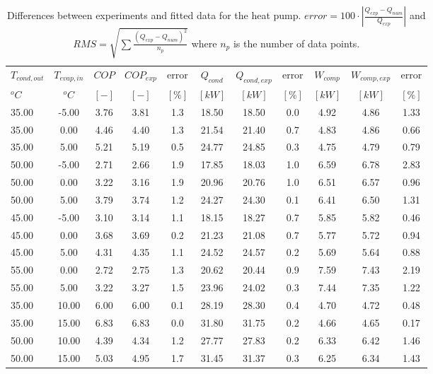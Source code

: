 \documentclass[english]{SPFShortReport}
\begin{document}
\begin{table}[!ht]
\begin{small}
\caption{Differences between experiments and fitted data for the heat pump.          $error=100 \cdot |\frac{Q_{exp}-Q_{num}}{Q_{exp}}|$ and $RMS = \sqrt { \sum{\frac{(Q_{exp}-Q_{num})^2}{n_p}} }$ where $n_p$ is the number of data points.}
\begin{center}
\resizebox{12cm}{!} 
{
\begin{tabular}{l | c c c c c c c c c c } 
\hline
\hline
$T_{cond,out}$ &$T_{evap,in}$ &$COP$ &$COP_{exp}$ &error &$Q_{cond}$ &$Q_{cond,exp}$ &error &$W_{comp}$ &$W_{comp,exp}$ &error \\ 
$^oC$ &$^oC$ &$[-]$ &$[-]$ &$[\%]$ &$[kW]$ &$[kW]$ &$[\%]$ &$[kW]$ &$[kW]$ &$[\%]$\\ 
\hline
35.00  & -5.00 & 3.76 & 3.81 & 1.3 & 18.50 & 18.50 & 0.0 & 4.92 & 4.86 & 1.33\\ 
35.00  & 0.00 & 4.46 & 4.40 & 1.3 & 21.54 & 21.40 & 0.7 & 4.83 & 4.86 & 0.66\\ 
35.00  & 5.00 & 5.21 & 5.19 & 0.5 & 24.77 & 24.85 & 0.3 & 4.75 & 4.79 & 0.79\\ 
50.00  & -5.00 & 2.71 & 2.66 & 1.9 & 17.85 & 18.03 & 1.0 & 6.59 & 6.78 & 2.83\\ 
50.00  & 0.00 & 3.22 & 3.16 & 1.9 & 20.96 & 20.76 & 1.0 & 6.51 & 6.57 & 0.96\\ 
50.00  & 5.00 & 3.79 & 3.74 & 1.2 & 24.27 & 24.30 & 0.1 & 6.41 & 6.50 & 1.31\\ 
45.00  & -5.00 & 3.10 & 3.14 & 1.1 & 18.15 & 18.27 & 0.7 & 5.85 & 5.82 & 0.46\\ 
45.00  & 0.00 & 3.68 & 3.69 & 0.2 & 21.23 & 21.08 & 0.7 & 5.77 & 5.72 & 0.94\\ 
45.00  & 5.00 & 4.31 & 4.35 & 1.1 & 24.52 & 24.57 & 0.2 & 5.69 & 5.64 & 0.88\\ 
55.00  & 0.00 & 2.72 & 2.75 & 1.3 & 20.62 & 20.44 & 0.9 & 7.59 & 7.43 & 2.19\\ 
55.00  & 5.00 & 3.22 & 3.27 & 1.5 & 23.96 & 24.02 & 0.3 & 7.44 & 7.35 & 1.22\\ 
35.00  & 10.00 & 6.00 & 6.00 & 0.1 & 28.19 & 28.30 & 0.4 & 4.70 & 4.72 & 0.48\\ 
35.00  & 15.00 & 6.83 & 6.83 & 0.0 & 31.80 & 31.75 & 0.2 & 4.66 & 4.65 & 0.17\\ 
50.00  & 10.00 & 4.39 & 4.34 & 1.2 & 27.77 & 27.83 & 0.2 & 6.33 & 6.42 & 1.46\\ 
50.00  & 15.00 & 5.03 & 4.95 & 1.7 & 31.45 & 31.37 & 0.3 & 6.25 & 6.34 & 1.43\\ 

\end{tabular}}
\end{center}
\end{small}
\end{table}
\end{document}
